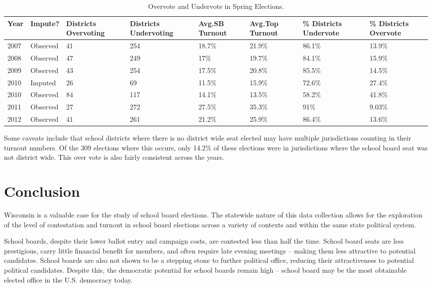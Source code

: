 \begin{table}[ht]
\centering
{\footnotesize
\begin{tabular}{p{.5in}p{.5in}p{.5in}p{.6in}p{.6in}p{.6in}p{.6in}p{.6in}}
  \hline
Year & Impute? & Districts Overvoting & Districts Undervoting & Avg.SB Turnout & Avg.Top Turnout & \% Districts Undervote & \% Districts Overvote \\ 
  \hline
2007 & Observed &  41 & 254 & 18.7\% & 21.9\% & 86.1\% & 13.9\% \\ 
  2008 & Observed &  47 & 249 & 17\% & 19.7\% & 84.1\% & 15.9\% \\ 
  2009 & Observed &  43 & 254 & 17.5\% & 20.8\% & 85.5\% & 14.5\% \\ 
  2010 & Imputed &  26 &  69 & 11.5\% & 15.9\% & 72.6\% & 27.4\% \\ 
  2010 & Observed &  84 & 117 & 14.1\% & 13.5\% & 58.2\% & 41.8\% \\ 
  2011 & Observed &  27 & 272 & 27.5\% & 35.3\% & 91\% & 9.03\% \\ 
  2012 & Observed &  41 & 261 & 21.2\% & 25.9\% & 86.4\% & 13.6\% \\ 
   \hline
\end{tabular}
}
\caption{Overvote and Undervote in Spring Elections.} 
\label{tab:undervotestats}
\end{table}


Some caveats include that school districts where there is no district wide seat 
elected may have multiple jurisdictions counting in their turnout numbers. Of 
the 309 
elections where this occurs, only 14.2\% 
of these elections were in jurisdictions where the school board seat was not 
district wide. This over vote is also fairly consistent across the years. 



\clearpage

\section{Conclusion}

Wisconsin is a valuable case for the study of school board elections. 
The statewide nature of this data collection allows for the exploration of the level 
of contestation and turnout in school board elections across a variety of contexts and 
within the same state political system. 

School boards, despite their lower ballot entry and campaign costs, are contested 
less than half the time. School board seats are less prestigious, carry little 
financial benefit for members, and often require late evening meetings -- making 
them less attractive to potential candidates. School boards are also not shown 
to be a stepping stone to further political office, reducing their attractiveness 
to potential political candidates. Despite this, the democratic potential for 
school boards remain high -- school board may be the most obtainable elected 
office in the U.S. democracy today. 


